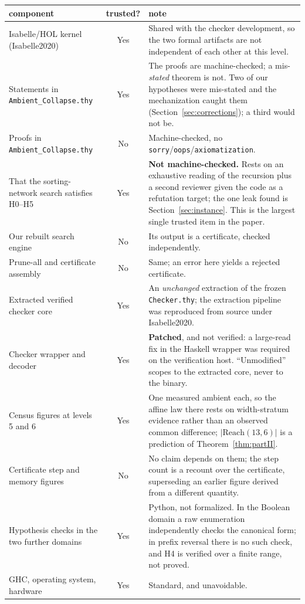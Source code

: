 \documentclass[11pt,a4paper]{article}
\theoremstyle{plain}
\theoremstyle{definition}
\theoremstyle{remark}
\newcommand{\Reach}{\mathrm{Reach}}
\begin{document}
\begin{center}
\begin{tabular}{>{\raggedright\arraybackslash}p{}c>{\raggedright\arraybackslash}p{}}
\toprule
component & trusted? & note \\
\midrule
Isabelle/HOL kernel (Isabelle2020) & Yes &
  Shared with the checker development, so the two formal artifacts are not
  independent of each other at this level. \\
Statements in \texttt{Ambient\_Collapse.thy} & Yes &
  The proofs are machine-checked; a mis-\emph{stated} theorem is not. Two of
  our hypotheses were mis-stated and the mechanization caught them
  (Section~\ref{sec:corrections}); a third would not be. \\
Proofs in \texttt{Ambient\_Collapse.thy} & No &
  Machine-checked, no \texttt{sorry}/\texttt{oops}/\texttt{axiomatization}. \\
That the sorting-network search satisfies H0--H5 & Yes &
  \textbf{Not machine-checked.} Rests on an exhaustive reading of the
  recursion plus a second reviewer given the code as a refutation target; the
  one leak found is Section~\ref{sec:instance}. This is the largest single
  trusted item in the paper. \\
Our rebuilt search engine & No &
  Its output is a certificate, checked independently. \\
Prune-all and certificate assembly & No &
  Same; an error here yields a rejected certificate. \\
Extracted verified checker core & Yes &
  An \emph{unchanged} extraction of the frozen \texttt{Checker.thy}; the
  extraction pipeline was reproduced from source under Isabelle2020. \\
Checker wrapper and decoder & Yes &
  \textbf{Patched}, and not verified: a large-read fix in the Haskell wrapper
  was required on the verification host. ``Unmodified'' scopes to the extracted
  core, never to the binary. \\
Census figures at levels 5 and 6 & Yes &
  One measured ambient each, so the affine law there rests on width-stratum
  evidence rather than an observed common difference; $|\Reach(13,6)|$ is a
  prediction of Theorem~\ref{thm:partII}. \\
Certificate step and memory figures & No &
  No claim depends on them; the step count is a recount over the certificate,
  superseding an earlier figure derived from a different quantity. \\
Hypothesis checks in the two further domains & Yes &
  Python, not formalized. In the Boolean domain a raw enumeration independently
  checks the canonical form; in prefix reversal there is no such check, and H4
  is verified over a finite range, not proved. \\
GHC, operating system, hardware & Yes & Standard, and unavoidable. \\
\bottomrule
\end{tabular}
\end{center}
\end{document}
